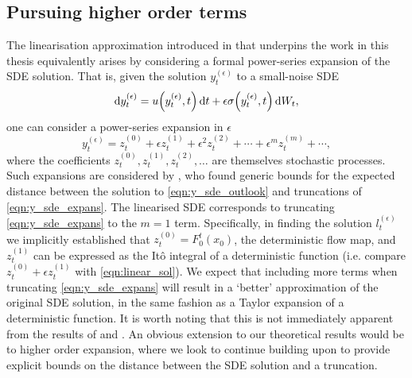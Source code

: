 \subsection{Pursuing higher order terms}
The linearisation approximation introduced in  that underpins the work in this thesis equivalently arises by considering a formal power-series expansion of the SDE solution.
That is, given the solution \(y_t^{(\epsilon)}\) to a small-noise SDE
\begin{equation}\label{eqn:y_sde_outlook}
	\dif y_t^{(\epsilon)} = u\!\left(y_t^{(\epsilon)}, t\right)\dif t + \epsilon \sigma\!\left(y_t^{(\epsilon)}, t\right)\dif W_t,
\end{equation}
one can consider a power-series expansion in \(\epsilon\)
\begin{equation}\label{eqn:y_sde_expans}
	y_t^{(\epsilon)} = z_t^{(0)} + \epsilon z_t^{(1)} + \epsilon^2 z_t^{(2)} + \dotsb + \epsilon^m z_t^{(m)} + \dotsb,
\end{equation}
where the coefficients \(z_t^{(0)}, z_t^{(1)}, z_t^{(2)}, \dotsc\) are themselves stochastic processes.
Such expansions are considered by \citet{Blagoveshchenskii_1962_DiffusionProcessesDepending}, who found generic bounds for the expected distance between the solution to \cref{eqn:y_sde_outlook} and truncations of \cref{eqn:y_sde_expans}.
The linearised SDE corresponds to truncating \cref{eqn:y_sde_expans} to the \(m = 1\) term.
Specifically, in finding the solution \(l_t^{(\epsilon)}\) we implicitly established that \(z_t^{(0)} = F_0^t\!\left(x_0\right)\), the deterministic flow map, and \(z_t^{(1)}\) can be expressed as the It\^o integral of a deterministic function (i.e. compare \(z_t^{(0)} + \epsilon z_t^{(1)}\) with \cref{eqn:linear_sol}).
We expect that including more terms when truncating \cref{eqn:y_sde_expans} will result in a `better' approximation of the original SDE solution, in the same fashion as a Taylor expansion of a deterministic function.
It is worth noting that this is not immediately apparent from the results of \citet{Blagoveshchenskii_1962_DiffusionProcessesDepending} and \citet{FreidlinWentzell_1998_RandomPerturbationsDynamical}.
An obvious extension to our theoretical results would be to higher order expansion, where we look to continue building upon \citet{Blagoveshchenskii_1962_DiffusionProcessesDepending,FreidlinWentzell_1998_RandomPerturbationsDynamical} to provide explicit bounds on the distance between the SDE solution and a truncation.
